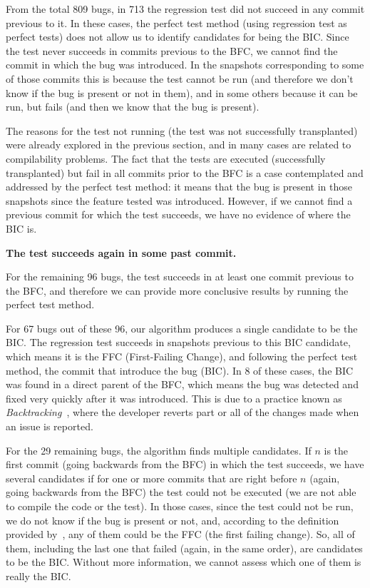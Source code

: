 From the total 809 bugs, in 713 the regression test did not succeed in any commit previous to it. 
In these cases, the perfect test method (using regression test as perfect tests) does not allow us to identify candidates for being the BIC. 
Since the test never succeeds in commits previous to the BFC, we cannot find the commit in which the bug was introduced. 
In the snapshots corresponding to some of those commits this is because the test cannot be run (and therefore we don't know if the bug is present or not in them), and in some others because it can be run, but fails (and then we know that the bug is present).

The reasons for the test not running (the test was not successfully transplanted) were already explored in the previous section, and in many cases are related to compilability problems. 
The fact that the tests are executed (successfully transplanted) but fail in all commits prior to the BFC is a case contemplated and addressed by the perfect test method: it means that the bug is present in those snapshots since the feature tested was introduced.
However, if we cannot find a previous commit for which the test succeeds, we have no evidence of where the BIC is.

\textbf{The test succeeds again in some past commit.}

For the remaining 96 bugs, the test succeeds in at least one commit previous to the BFC, and therefore we can provide more conclusive results by running the perfect test method.

For 67 bugs out of these 96, our algorithm produces a single candidate to be the BIC. 
The regression test succeeds in snapshots previous to this BIC candidate, which means it is the FFC (First-Failing Change), and following the perfect test method, the commit that introduce the bug (BIC). 
In 8 of these cases, the BIC was found in a direct parent of the BFC, which means the bug was detected and fixed very quickly after it was introduced. 
This is due to a practice known as \textit{Backtracking}~\cite{yoon2012exploratory,yoon2014longitudinal}, where the developer reverts part or all of the changes made when an issue is reported.

For the 29 remaining bugs, the algorithm finds multiple candidates. 
If $n$ is the first commit (going backwards from the BFC) in which the test succeeds, we have several candidates if for one or more commits that are right before $n$ (again, going backwards from the BFC) the test could not be executed (we are not able to compile the code or the test).
In those cases, since the test could not be run, we do not know if the bug is present or not, and, according to the definition provided by~\gema, any of them could be the FFC (the first failing change).
So, all of them, including the last one that failed (again, in the same order), are candidates to be the BIC. 
Without more information, we cannot assess which one of them is really the BIC.

